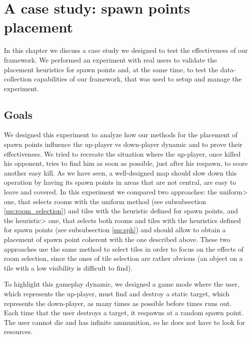 \chapter{A case study: spawn points placement}


In this chapter we discuss a case study we designed to test the effectiveness of our framework. We
performed an experiment with real users to validate the placement heuristics for spawn points and, at the same time, to test the data-collection capabilities of our framework, that was used to setup and manage the experiment.


\section{Goals}

We designed this experiment to analyze how our methods for the placement of spawn points influence the up-player vs down-player dynamic and to prove their effectiveness. We tried to recreate the situation where the up-player, once killed his opponent, tries to find him as soon as possible, just after his respawn, to score another easy kill. As we have seen, a well-designed map should slow down this operation by having its spawn points in areas that are not central, are easy to leave and covered. In this experiment we compared two approaches: the \<uniform> one, that selects rooms with the uniform method (see subsubsection \ref{sss:room_selection}) and tiles with the heuristic defined for spawn points, and the \<heuristic> one, that selects both rooms and tiles with the heuristics defined for spawn points (see subsubsection \ref{sss:sph}) and should allow to obtain a placement of spawn point coherent with the one described above. These two approaches use the same method to select tiles in order to focus on the effects of room selection, since the ones of tile selection are rather obvious (an object on a tile with a low visibility is difficult to find).

\par

To highlight this gameplay dynamic, we designed a game mode where the user, which represents the up-player, must find and destroy a static target, which represents the down-player, as many times as possible before times runs out. Each time that the user destroys a target, it respawns at a random spawn point. The user cannot die and has infinite ammunition, so he does not have to look for resources.

